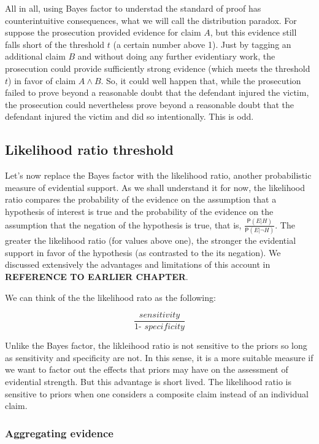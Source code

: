 \documentclass[10pt,dvipsnames,enabledeprecatedfontcommands]{scrartcl}
\newcommand{\pr}[1]{\mathsf{P}(#1)}
\begin{document}
All in all, using Bayes factor to understad the standard of proof has
counterintuitive consequences, what we will call the distribution
paradox. For suppose the prosecution provided evidence for claim \(A\),
but this evidence still falls short of the threshold \(t\) (a certain
number above 1). Just by tagging an additional claim \(B\) and without
doing any further evidentiary work, the prosecution could provide
sufficiently strong evidence (which meets the threshold \(t\)) in favor
of claim \(A \wedge B\). So, it could well happen that, while the
prosecution failed to prove beyond a reasonable doubt that the defendant
injured the victim, the prosecution could nevertheless prove beyond a
reasonable doubt that the defendant injured the victim and did so
intentionally. This is odd.

\hypertarget{likelihood-ratio-threshold}{%
\subsection{Likelihood ratio
threshold}\label{likelihood-ratio-threshold}}

Let's now replace the Bayes factor with the likelihood ratio, another
probabilistic measure of evidential support. As we shall understand it
for now, the likelihood ratio compares the probability of the evidence
on the assumption that a hypothesis of interest is true and the
probability of the evidence on the assumption that the negation of the
hypothesis is true, that is,
\(\frac{\pr{E \vert H}}{\pr{E \vert \neg H}}\). The greater the
likelihood ratio (for values above one), the stronger the evidential
support in favor of the hypothesis (as contrasted to the its negation).
We discussed extensively the advantages and limitations of this account
in \textbf{REFERENCE TO EARLIER CHAPTER}.

We can think of the the likelihood rato as the following:

\[\frac{\textit{sensitivity}}{\textit{1- specificity}}\]

\noindent Unlike the Bayes factor, the likleihood ratio is not sensitive
to the priors so long as sensitivity and specificity are not. In this
sense, it is a more suitable measure if we want to factor out the
effects that priors may have on the assessment of evidential strength.
But this advantage is short lived. The likelihood ratio is sensitive to
priors when one considers a composite claim instead of an individual
claim.

\hypertarget{aggregating-evidence-1}{%
\subsubsection{Aggregating evidence}\label{aggregating-evidence-1}}
\end{document}
